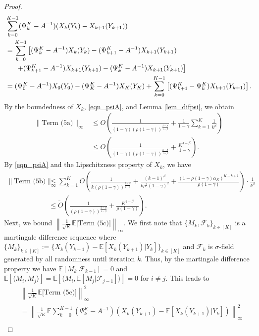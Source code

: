 \documentclass{opt2025} %
\begin{document}
\begin{proof}
\begin{align*}
&\sum_{k=0}^{K-1} (\Psi_k^K- A^{-1}) (X_k(Y_{k}) - X_{k+1}(Y_{k+1})) \\
&= \sum_{k=0}^{K-1} \left[ (\Psi_k^K- A^{-1}) X_k(Y_{k}) -  (\Psi_{k+1}^K- A^{-1}) X_{k+1}(Y_{k+1}) \right.\\
&\indent \left. + (\Psi_{k+1}^K- A^{-1}) X_{k+1}(Y_{k+1}) -  (\Psi_k^K- A^{-1}) X_{k+1}(Y_{k+1})\right]\\
&= (\Psi_0^K- A^{-1}) X_0(Y_{0}) -  (\Psi_{K}^K- A^{-1}) X_{K}(Y_{K}) + \sum_{k=0}^{K-1} \left[ (\Psi_{k+1}^K - \Psi_{k}^K) X_{k+1}(Y_{k+1})\right].
\end{align*}
By the boundedness of $X_k$, \cref{eqn_psiA}, and Lemma \ref{lem_difpsi}, we obtain
\begin{align*}
\| \text{Term (5a)} \|_{\infty} &\leq O\left(\frac{1}{(1-\gamma)(\rho(1-\gamma))^{\frac{2-\beta}{1-\beta}}} + \frac{1}{1-\gamma} \sum_{k=1}^{K} \frac{1}{k^{\beta}} \right)\\
&\leq O\left( \frac{1}{(1-\gamma)(\rho(1-\gamma))^{\frac{2-\beta}{1-\beta}}}+\frac{K^{1-\beta}}{1-\gamma} \right).
\end{align*}
By \cref{eqn_psiA} and the Lipschitzness property of $X_k$, we have
\begin{align*}
\| \text{Term (5b)} \|_{\infty} &\leq \sum_{k=1}^K O\left( \frac{1}{k(\rho(1-\gamma))^{\frac{2-\beta}{1-\beta}}}  + \frac{(k-1)^{\beta}}{k\rho^2(1-\gamma)^2} + \frac{(1-\rho(1-\gamma)\alpha_K)^{K-k+1}}{\rho(1-\gamma)}  \right) \cdot \frac{1}{k^{\beta}}\\
&\leq \tilde{O}\left(\frac{1}{(\rho(1-\gamma))^{\frac{2-\beta}{1-\beta}}} + \frac{K^{1-\beta}}{\rho(1-\gamma)} \right).
\end{align*}
Next, we bound $\left\| \frac{1}{\sqrt{K}} \mathbb{E}[\text{Term (5c)]} \right\|_{\infty}$. We first note that $\{M_k,\mathcal{F}_k\}_{k\in[K]}$ is a martingale difference sequence where $\{M_k\}_{k\in[K]}:=\{X_k(Y_{k+1}) - \mathbb{E}[X_k(Y_{k+1})|Y_k]\}_{k\in[K]}$ and $\mathcal{F}_k$ is $\sigma$-field generated by all randomness until iteration $k$. Thus, by the martingale difference property we have $\mathbb{E}[M_k|\mathcal{F}_{k-1}]=0$ and $\mathbb{E}[\langle M_i,M_j\rangle] = \mathbb{E}[\langle M_i, \mathbb{E}[M_j|\mathcal{F}_{j-1}]\rangle] =0$ for $i\neq j$. This leads to
\begin{align*}
&\left\| \frac{1}{\sqrt{K}} \mathbb{E}[\text{Term (5c)]} \right\|^2_{\infty} \\
&=\left\| \frac{1}{\sqrt{K}}  \mathbb{E} \sum_{k=0}^{K-1} (\Psi_k^K- A^{-1})( X_{k}(Y_{k+1}) - \mathbb{E}[X_k(Y_{k+1})| Y_{k}]) \right\|^2_{\infty}\\

\end{align*}
\end{proof}
\end{document}
